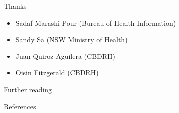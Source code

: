 \documentclass[aspectratio=169,12pt,usepdftitle=false]{beamer} %
\begin{document}





\begin{frame}{Thanks}
    \begin{itemize}
        \item Sadaf Marashi-Pour (Bureau of Health Information)
	\item Sandy Sa (NSW Ministry of Health)
	\item Juan Quiroz Aguilera (CBDRH)
	\item Oisin Fitzgerald (CBDRH)
    \end{itemize}
\end{frame}

\begin{frame}{Further reading}
\end{frame}

\begin{frame}{References}
        \tiny
        
\end{frame}
\end{document}
